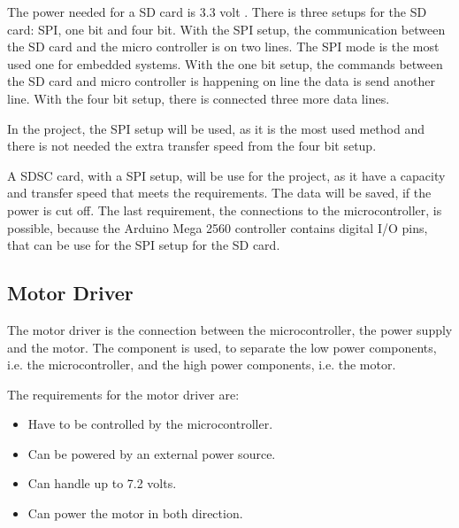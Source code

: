 \begin{minipage}{\linewidth}
\begin{minipage}{0.65\linewidth}
\begin{table} [H]
\begin{tabular}{|l|l|l|l|}
					
					
				\end{tabular}							
			\end{table}			
      \end{minipage}
  \end{minipage}



The power needed for a SD card is 3.3 volt . There is three setups for the SD card: SPI, one bit and four bit. With the SPI setup, the communication between the SD card and the micro controller is on two lines. The SPI mode is the most used one for embedded systems.
With the one bit setup, the commands between the SD card and micro controller is happening on line the data is send another line. With the four bit setup, there is connected three more data lines.

In the project, the SPI setup will be used, as it is the most used method and there is not needed the extra transfer speed from the four bit setup.


A SDSC card, with a SPI setup, will be use for the project, as it have a capacity and transfer speed that meets the requirements. The data will be saved, if the power is cut off. The last requirement, the connections to the microcontroller, is possible, because the Arduino Mega 2560 controller contains  digital I/O pins, that can be use for the SPI setup for the SD card.


\subsection{Motor Driver}
The motor driver is the connection between the microcontroller, the power supply and the motor. The component is used, to separate the low power components, i.e. the microcontroller, and the high power components, i.e. the motor.

The requirements for the motor driver are:
\begin{itemize}
\item Have to be controlled by the microcontroller.
\item Can be powered by an external power source.
\item Can handle up to 7.2 volts. 
\item Can power the motor in both direction.
\end{itemize}

